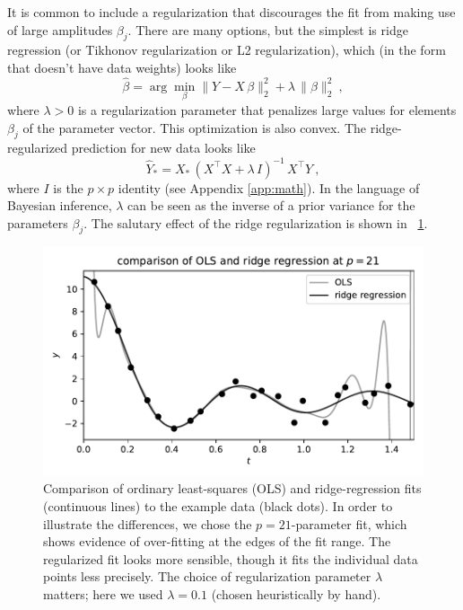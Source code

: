 \documentclass[12pt,letterpaper]{article}
\newlength{\figurewidth}
\begin{document}
It is common to include a regularization that discourages the fit from making use of large amplitudes $\beta_j$.
There are many options, but the simplest is ridge regression (or Tikhonov regularization or L2 regularization), which (in the form that doesn't have data weights) looks like
\begin{equation} \label{eq:ridge}
    \hat{\beta} = \arg\min_\beta \|Y - X\,\beta\|_2^2 + \lambda\,\|\beta\|_2^2
    ~,
\end{equation}
where $\lambda>0$ is a regularization parameter that penalizes large values for elements $\beta_j$ of the parameter vector.
This optimization is also convex.
The ridge-regularized prediction for new data looks like
\begin{equation} \label{eq:ridge_sol}
    \hat{Y}_\ast = X_\ast\,(X^\top X + \lambda\,I)^{-1}\,X^\top Y
    ~,
\end{equation}
where $I$ is the $p\times p$ identity (see Appendix \ref{app:math}).
In the language of Bayesian inference, $\lambda$ can be seen as the inverse of a prior variance for the parameters $\beta_j$.
The salutary effect of the ridge regularization is shown in \figurename~\ref{fig:ridge}.
\begin{figure}[t]
    \begin{mdframed}
    \includegraphics[width=\figurewidth]{./ridge.pdf}
    \caption{Comparison of ordinary least-squares (OLS) and ridge-regression fits (continuous lines) to the example data (black dots). In order to illustrate the differences, we chose the $p=21$-parameter fit, which shows evidence of over-fitting at the edges of the fit range. The regularized fit looks more sensible, though it fits the individual data points less precisely. The choice of regularization parameter $\lambda$ matters; here we used $\lambda=0.1$ (chosen heuristically by hand).}
    \label{fig:ridge}
    \end{mdframed}
\end{figure}
\end{document}
